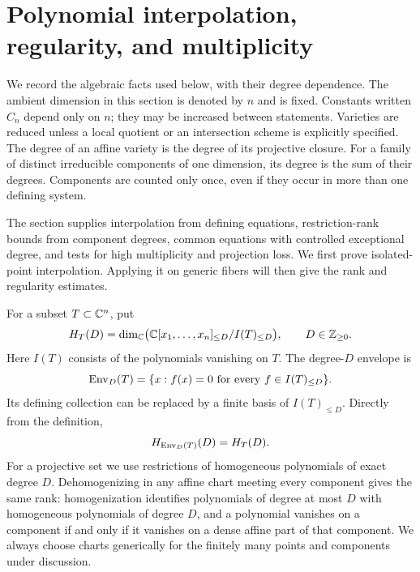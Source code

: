 \section{Polynomial interpolation, regularity, and multiplicity}
\label{poly:section}

We record the algebraic facts used below, with their degree dependence.  The
ambient dimension in this section is denoted by $n$ and is fixed.  Constants
written $C_n$ depend only on $n$; they may be increased between statements.
Varieties are reduced unless a local quotient or an intersection scheme is
explicitly specified.  The degree of an affine variety is the degree of its
projective closure.  For a family of distinct irreducible components of one
dimension, its degree is the sum of their degrees.  Components are counted
only once, even if they occur in more than one defining system.

The section supplies interpolation from defining equations, restriction-rank
bounds from component degrees, common equations with controlled exceptional
degree, and tests for high multiplicity and projection loss.  We first
prove isolated-point interpolation.  Applying it on generic fibers will
then give the rank and regularity estimates.

For a subset $T\subset\mathbb C^n$, put
\[
 H_T(D)=\dim_{\mathbb C}\bigl(\mathbb C[x_1,\ldots,x_n]_{\le D}/
           I(T)_{\le D}\bigr),\qquad D\in\mathbb Z_{\ge0}.
\]
Here $I(T)$ consists of the polynomials vanishing on $T$.  The degree-$D$
envelope is
\[
 \operatorname{Env}_D(T)=\{x:f(x)=0\text{ for every }f\in I(T)_{\le D}\}.
\]
Its defining collection can be replaced by a finite basis of
$I(T)_{\le D}$.  Directly from the definition,
\begin{equation}\label{poly:envelope-equality}
 H_{\operatorname{Env}_D(T)}(D)=H_T(D).
\end{equation}
For a projective set we use restrictions of homogeneous polynomials of
exact degree $D$.  Dehomogenizing in any affine chart meeting every
component gives the same rank: homogenization identifies polynomials of
degree at most $D$ with homogeneous polynomials of degree $D$, and a
polynomial vanishes on a component if and only if it vanishes on a dense
affine part of that component.  We always choose charts generically for
the finitely many points and components under discussion.

